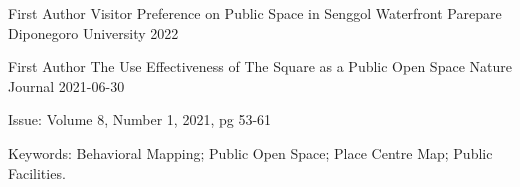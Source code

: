 

\begin{cventries}

  \cventry
    {First Author} %
    {Visitor Preference on Public Space in Senggol Waterfront Parepare} %
    {Diponegoro University} %
    {2022} %
    {}

  \cventry
    {First Author} %
    {The Use Effectiveness of The Square as a Public Open Space} %
    {Nature Journal} %
    {2021-06-30} %
    {
      \begin{cvitems} %
        \item {Issue: Volume 8, Number 1, 2021, pg 53-61}
        \item {Keywords: Behavioral Mapping; Public Open Space; Place Centre Map; Public Facilities. }
      \end{cvitems}
    }

\end{cventries}
